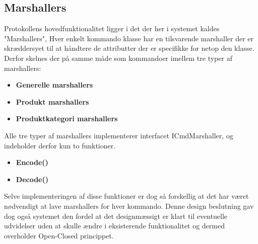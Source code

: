 \subsection{Marshallers}

Protokollens hovedfunktionalitet ligger i det der her i systemet kaldes "Marshallers", Hver enkelt kommando klasse har en tilsvarende marshaller der er skræddersyet til at håndtere de attributter der er specifikke for netop den klasse. Derfor skelnes der på samme måde som kommandoer imellem tre typer af marshallers:

\begin{itemize}
	\item \textbf{Generelle marshallers} 
	\item \textbf{Produkt marshallers} 
	\item \textbf{Produktkategori marshallers}
\end{itemize}

Alle tre typer af marshallers implementerer interfacet ICmdMarshaller, og indeholder derfor kun to funktioner.

\begin{itemize}
	\item \textbf{Encode()} 
	\item \textbf{Decode()} 
\end{itemize}

Selve implementeringen af disse funktioner er dog så forskellig at det har været nødvendigt at lave marshallers for hver kommando. Denne design beslutning gav dog også systemet den fordel at det designmæssigt er klart til eventuelle udvidelser uden at skulle ændre i eksisterende funktionalitet og dermed overholder Open-Closed princippet.


